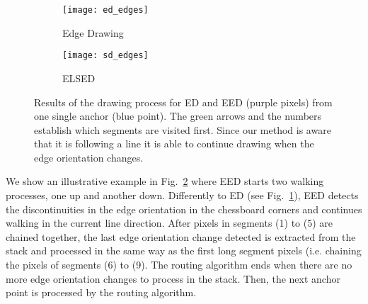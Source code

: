 \documentclass[preprint,12pt]{elsarticle}
\begin{document}
\begin{figure}
    \centering
    \begin{subfigure}{0.48\textwidth}
     \centering
     \texttt{[image: ed\_edges]}
     \caption{Edge Drawing~\cite{topal2012edge}}
     \label{fig:drawing-result-1}
    \end{subfigure}
    \begin{subfigure}{.48\textwidth}
     \texttt{[image: sd\_edges]}
     \caption{ELSED}
     \label{fig:drawing-result-2}
    \end{subfigure}
     \caption{Results of the  drawing process for ED and EED (purple pixels) from one single anchor (blue point). The green arrows and the numbers establish which segments are visited first. Since our method is aware that it is following a line it is able to continue drawing when the edge orientation changes. 
     }
     \label{fig:drawing-result}
\end{figure}

We show an illustrative example in Fig.~\ref{fig:drawing-result-2} where EED starts two walking processes, one up and another down. Differently to ED (see Fig.~\ref{fig:drawing-result-1}), EED detects the discontinuities in the edge orientation in the chessboard corners and continues walking in the current line direction. After pixels in segments (1) to (5) are chained together, the last edge orientation change detected is extracted from the stack and processed in the same way as the first long segment pixels (i.e. chaining the pixels of segments (6) to (9). The routing algorithm ends when there are no more edge orientation changes to process in the stack. Then, the next anchor point is processed by the routing algorithm.
\end{document}
